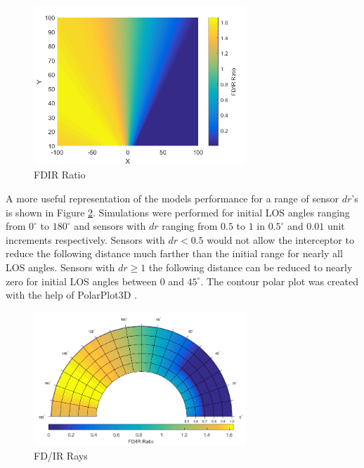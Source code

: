 \documentclass[conference]{IEEEtran}
\begin{document}




\begin{figure}[H]
	\centering
	\includegraphics[width=8cm]{FDIR_Rays.png}
	\caption{FDIR Ratio}
	\label{fig:Rays}
\end{figure}

A more useful representation of the models performance for a range of sensor $dr$'s is shown in Figure \ref{fig:Polar}. Simulations were performed for initial LOS angles ranging from $0^{\circ}$ to $180^{\circ}$ and sensors with $dr$ ranging from $0.5$ to $1$ in $0.5^{\circ}$ and $0.01$ unit increments respectively. Sensors with $dr < 0.5$ would not allow the interceptor to reduce the following distance much farther than the initial range for nearly all LOS angles. Sensors with $dr \geq 1$ the following distance can be reduced to nearly zero for initial LOS angles between $0$ and $45^{\circ}$. The contour polar plot was created with the help of PolarPlot3D \cite{Polar3d}.

\begin{figure}[H]
	\centering
	\includegraphics[width=8cm]{correctpolar.png}
	\caption{FD/IR Rays}
	\label{fig:Polar}
\end{figure}
\end{document}
